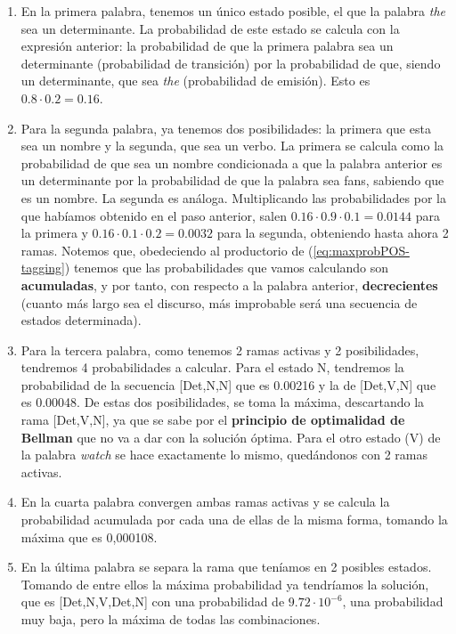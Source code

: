 \documentclass{article}
\begin{document}
\begin{enumerate}
    \item En la primera palabra, tenemos un único estado posible, el que la palabra \textit{the} sea un determinante. La probabilidad de este estado se calcula con la expresión anterior: la probabilidad de que la primera palabra sea un determinante (probabilidad de transición) por la probabilidad de que, siendo un determinante, que sea \textit{the} (probabilidad de emisión). Esto es $0.8 \cdot 0.2 = 0.16$.
    \item Para la segunda palabra, ya tenemos dos posibilidades: la primera que esta sea un nombre y la segunda, que sea un verbo. La primera se calcula como la probabilidad de que sea un nombre condicionada a que la palabra anterior es un determinante por la probabilidad de que la palabra sea fans, sabiendo que es un nombre. La segunda es análoga. Multiplicando las probabilidades por la que habíamos obtenido en el paso anterior, salen $0.16 \cdot 0.9 \cdot 0.1 = 0.0144$ para la primera y $0.16 \cdot 0.1 \cdot 0.2 = 0.0032$ para la segunda, obteniendo hasta ahora 2 ramas. Notemos que, obedeciendo al productorio de (\ref{eq:maxprobPOS-tagging}) tenemos que las probabilidades que vamos calculando son \textbf{acumuladas}, y por tanto, con respecto a la palabra anterior, \textbf{decrecientes} (cuanto más largo sea el discurso, más improbable será una secuencia de estados determinada).
    \item Para la tercera palabra, como tenemos 2 ramas activas y 2 posibilidades, tendremos 4 probabilidades a calcular. Para el estado N, tendremos la probabilidad de la secuencia [Det,N,N] que es 0.00216 y la de [Det,V,N] que es 0.00048. De estas dos posibilidades, se toma la máxima, descartando la rama [Det,V,N], ya que se sabe por el \textbf{principio de optimalidad de Bellman} que no va a dar con la solución óptima. Para el otro estado (V) de la palabra \textit{watch} se hace exactamente lo mismo, quedándonos con 2 ramas activas.
    \item En la cuarta palabra convergen ambas ramas activas y se calcula la probabilidad acumulada por cada una de ellas de la misma forma, tomando la máxima que es 0,000108.
    \item En la última palabra se separa la rama que teníamos en 2 posibles estados. Tomando de entre ellos la máxima probabilidad ya tendríamos la solución, que es [Det,N,V,Det,N] con una probabilidad de $9.72 \cdot 10^{-6}$, una probabilidad muy baja, pero la máxima de todas las combinaciones.
\end{enumerate}
\end{document}
